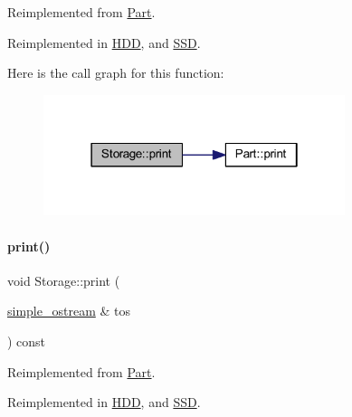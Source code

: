 Reimplemented from \mbox{\hyperlink{class_part_a9ecabe44ba3415badf82c6a23617a41e}{Part}}.



Reimplemented in \mbox{\hyperlink{class_h_d_d_aca2c2583fa3304917905cd9185b64539}{H\+DD}}, and \mbox{\hyperlink{class_s_s_d_ab07086e302f8be99cfa757583d2017a0}{S\+SD}}.

Here is the call graph for this function\+:
\nopagebreak
\begin{figure}[H]
\begin{center}
\leavevmode
\includegraphics[width=250pt]{class_storage_ab7ecf9e0777891b4e1a84bbf391a1cd4_cgraph}
\end{center}
\end{figure}
\mbox{\label{class_storage_a53fc5b4814df41517b9f2be8dcef605e}} 
\paragraph{\texorpdfstring{print()}{print()}\hspace{0.1cm}{\footnotesize\ttfamily [3/4]}}
{\footnotesize\ttfamily void Storage\+::print (\begin{DoxyParamCaption}\item[{\mbox{\hyperlink{structsimple__ostream}{simple\+\_\+ostream}} \&}]{tos }\end{DoxyParamCaption}) const\hspace{0.3cm}{\ttfamily [virtual]}}



Reimplemented from \mbox{\hyperlink{class_part_aa602d876151b63db72cf8f666847a8cd}{Part}}.



Reimplemented in \mbox{\hyperlink{class_h_d_d_a0e48767713740f3ec7dafd907d3570b1}{H\+DD}}, and \mbox{\hyperlink{class_s_s_d_a7efed56d8590399c61d8eefca9295c91}{S\+SD}}.

